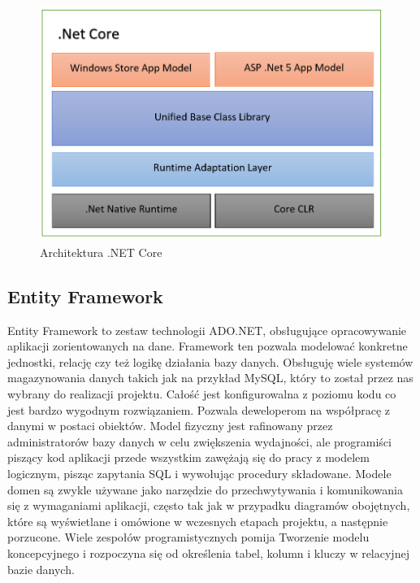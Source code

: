 \documentclass[12pt,a4paper]{article}
\begin{document}
\begin{figure}[h]
	\centering
	\includegraphics[width=0.7\linewidth]{net-Core-1}
	\caption{Architektura .NET Core}
	\label{fig:net-core-1}
\end{figure}

\subsection{Entity Framework}   %

\hspace*{0.7cm} Entity Framework to zestaw technologii ADO.NET, obsługujące opracowywanie aplikacji zorientowanych na dane. Framework ten pozwala modelować konkretne jednostki, relację czy też logikę działania bazy danych. Obsługuję wiele systemów magazynowania danych takich jak na przykład MySQL, który to został przez nas wybrany do realizacji projektu. Całość jest konfigurowalna z poziomu kodu co jest bardzo wygodnym rozwiązaniem. Pozwala deweloperom na współpracę z danymi w postaci obiektów. Model fizyczny jest rafinowany przez administratorów bazy danych w celu zwiększenia wydajności, ale programiści piszący kod aplikacji przede wszystkim zawężają się do pracy z modelem logicznym, pisząc zapytania SQL i wywołując procedury składowane. Modele domen są zwykle używane jako narzędzie do przechwytywania i komunikowania się z wymaganiami aplikacji, często tak jak w przypadku diagramów obojętnych, które są wyświetlane i omówione w wczesnych etapach projektu, a następnie porzucone. Wiele zespołów programistycznych pomija Tworzenie modelu koncepcyjnego i rozpoczyna się od określenia tabel, kolumn i kluczy w relacyjnej bazie danych.\newline
\end{document}

